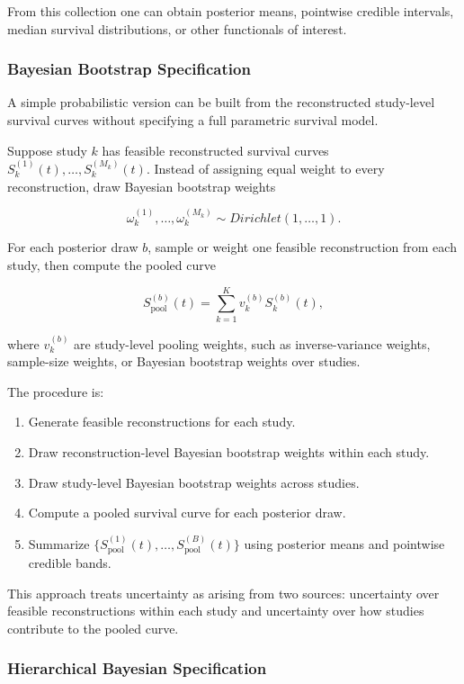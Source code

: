\documentclass[11pt]{article}
\begin{document}
From this collection one can obtain posterior means, pointwise credible intervals, median survival distributions, or other functionals of interest.

\subsubsection*{Bayesian Bootstrap Specification}

A simple probabilistic version can be built from the reconstructed study-level survival curves without specifying a full parametric survival model.

Suppose study \(k\) has feasible reconstructed survival curves \(S_{k}^{(1)}(t),\ldots,S_{k}^{(M_k)}(t)\). Instead of assigning equal weight to every reconstruction, draw Bayesian bootstrap weights

\[\omega_{k}^{(1)},\ldots,\omega_{k}^{(M_k)}\sim Dirichlet(1,\ldots,1).\]

For each posterior draw \(b\), sample or weight one feasible reconstruction from each study, then compute the pooled curve

\[S_{\text{pool}}^{(b)}(t)=\sum_{k=1}^{K}v_k^{(b)}S_k^{(b)}(t),\]

where \(v_k^{(b)}\) are study-level pooling weights, such as inverse-variance weights, sample-size weights, or Bayesian bootstrap weights over studies.

The procedure is:

\begin{enumerate}
\item Generate feasible reconstructions for each study.
\item Draw reconstruction-level Bayesian bootstrap weights within each study.
\item Draw study-level Bayesian bootstrap weights across studies.
\item Compute a pooled survival curve for each posterior draw.
\item Summarize \(\{S_{\text{pool}}^{(1)}(t),\ldots,S_{\text{pool}}^{(B)}(t)\}\) using posterior means and pointwise credible bands.
\end{enumerate}

This approach treats uncertainty as arising from two sources: uncertainty over feasible reconstructions within each study and uncertainty over how studies contribute to the pooled curve.

\subsubsection*{Hierarchical Bayesian Specification}
\end{document}
